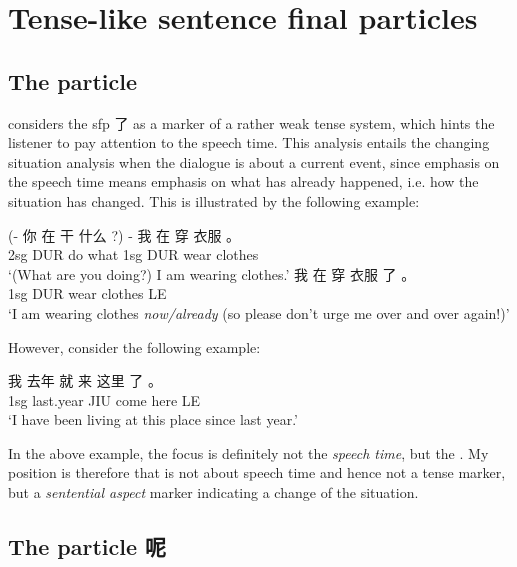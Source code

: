 \documentclass[../main.tex]{subfiles}
\begin{document}
\section{Tense-like sentence final particles}

\subsection{The particle }\label{sec:sfp-le}

\citep[]{meiguang2018} considers the \ac{sfp} 了 as a marker of a rather weak tense system,
which hints the listener to pay attention to the speech time. 
This analysis entails the changing situation analysis when the dialogue is about a current event, 
since emphasis on the speech time means emphasis on what has already happened, i.e. 
how the situation has changed.
This is illustrated by the following example: 
\begin{exe}
    \ex \begin{xlist}
        \ex \gll (- 你 在 干 什么 ?) - 我 在 穿 衣服 。 \\
        {} 2sg DUR do what {} {} 1sg DUR wear clothes \\
        \glt `(What are you doing?) I am wearing clothes.' 
        \ex \gll 我 在 穿 衣服 了 。 \\
        1sg DUR wear clothes LE \\
        \glt `I am wearing clothes \emph{now/already} (so please don't urge me over and over again!)'
    \end{xlist}
\end{exe}
However, consider the following example:
\begin{exe}
    \ex \gll 我 去年 就 来 这里 了 。\\
    1sg last.year JIU come here LE \\ %
    \glt `I have been living at this place since last year.'
\end{exe}
In the above example, the focus is definitely not the \emph{speech time},
but the . %
My position is therefore that  is not about speech time and hence not a tense marker, 
but a \emph{sentential aspect} marker \citep{pan2022deriving} indicating a change of the situation. 

\subsection{The particle 呢}
\end{document}

